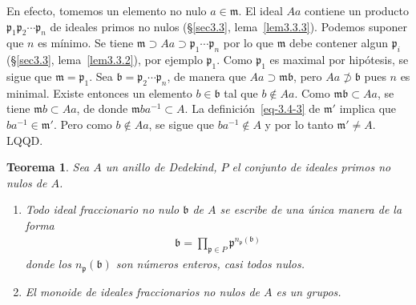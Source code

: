 \documentclass[bibtotoc,leqno,spanish]{amsbook}
\newcommand{\idl}[1]{\mathfrak{#1}}
\newcommand{\QED}{LQQD.}
\numberwithin{equation}{section}
\theoremstyle{note}
\theoremstyle{note}
\newtheorem{theorem}{Teorema}
\theoremstyle{rem}
\numberwithin{theorem}{section}
\numberwithin{proposition}{section}
\numberwithin{definition}{section}
\numberwithin{lemma}{section}
\numberwithin{corollary}{section}
\numberwithin{example}{section}
\numberwithin{footnote}{section}%
\begin{document}
En efecto, tomemos un elemento no nulo $a\in\idl{m}$. El ideal $Aa$ contiene un producto
$\idl{p}_{1}\idl{p}_{2}\cdots\idl{p}_{n}$ de ideales primos no nulos (\S\ref{sec3.3}, lema~\ref{lem3.3.3}). Podemos suponer que $n$
es m\'inimo. Se tiene $\idl{m}\supset Aa\supset\idl{p}_{1}\cdots\idl{p}_{n}$ por lo que $\idl{m}$ debe
contener algun $\idl{p}_{i}$ (\S\ref{sec3.3}, lema~\ref{lem3.3.2}), por ejemplo $\idl{p}_{1}$. Como $\idl{p}_{1}$ es maximal por
hip\'otesis, se sigue que $\idl{m} = \idl{p}_{1}$. Sea $\idl{b} = \idl{p}_{2}\cdots\idl{p}_{n}$, de manera
que $Aa\supset\idl{m}\idl{b}$, pero $Aa\not\supset\idl{b}$ pues $n$ es minimal. Existe entonces un elemento
$b\in\idl{b}$ tal que $b\notin Aa$. Como $\idl{m}\idl{b}\subset Aa$, se tiene $\idl{m}b\subset Aa$, de donde
$\idl{m}ba^{-1}\subset A$. La definici\'on~\eqref{eq-3.4-3} de $\idl{m}'$ implica que $ba^{-1}\in\idl{m}'$. Pero como
$b\notin Aa$, se sigue que $ba^{-1}\notin A$ y por lo tanto $\idl{m}'\neq A$. \QED

\begin{theorem}\label{teo3.4.3}
Sea $A$ un anillo de Dedekind, $P$ el conjunto de ideales primos no nulos de $A$.
\begin{enumerate}
\item Todo ideal fraccionario no nulo $\idl{b}$ de $A$ se escribe de una \'unica manera de la forma
\begin{gather}\label{eq-3.4-4}
\idl{b} = \prod_{\idl{p}\in P}\idl{p}^{n_{\idl{p}}(\idl{b})}
\end{gather}
donde los $n_{\idl{p}}(\idl{b})$ son n\'umeros enteros, casi todos nulos.
\item El monoide de ideales fraccionarios no nulos de $A$ es un grupos.
\end{enumerate}
\end{theorem}
\end{document}
